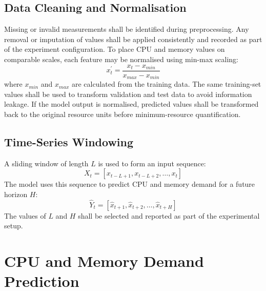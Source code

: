 \documentclass[12pt,a4paper]{report}
\begin{document}
\subsection{Data Cleaning and Normalisation}
Missing or invalid measurements shall be identified during preprocessing. Any removal or imputation of values shall be applied consistently and recorded as part of the experiment configuration.
To place CPU and memory values on comparable scales, each feature may be normalised using min-max scaling:
\begin{equation}
x_{t}^{\prime} = \frac{x_{t} - x_{min}}{x_{max} - x_{min}}
\end{equation}
where $x_{min}$ and $x_{max}$ are calculated from the training data. The same training-set values shall be used to transform validation and test data to avoid information leakage.
If the model output is normalised, predicted values shall be transformed back to the original resource units before minimum-resource quantification.

\subsection{Time-Series Windowing}
A sliding window of length $L$ is used to form an input sequence:
\begin{equation}
X_{t} = [x_{t-L+1}, x_{t-L+2}, \dots, x_{t}]
\end{equation}
The model uses this sequence to predict CPU and memory demand for a future horizon $H$:
\begin{equation}
\hat{Y}_{t} = [\hat{x}_{t+1}, \hat{x}_{t+2}, \dots, \hat{x}_{t+H}]
\end{equation}
The values of $L$ and $H$ shall be selected and reported as part of the experimental setup.
\lipsum[47-49]

\section{CPU and Memory Demand Prediction}
\end{document}
